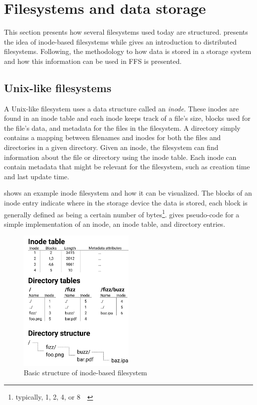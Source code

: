\section{Filesystems and data storage}
This section presents how several filesystems used today are structured.  presents the idea of \mbox{inode-based} filesystems while  gives an introduction to distributed filesystems. Following, the methodology to how data is stored in a storage system and how this information can be used in \gls{FFS} is presented.

\subsection{\mbox{Unix-like} filesystems}
\label{sec:inodeFSintroduction}
A \mbox{Unix-like} filesystem uses a data structure called an \textit{inode}. These inodes are found in an inode table and each inode keeps track of a file's size, blocks used for the file's data, and metadata for the files in the filesystem. A directory simply contains a mapping between filenames and inodes for both the files and directories in a given directory. Given an inode, the filesystem can find information about the file or directory using the inode table. Each inode can contain metadata that might be relevant for the filesystem, such as creation time and last update time. 

 shows an example inode filesystem and how it can be visualized. The blocks of an inode entry indicate where in the storage device the data is stored, each block is generally defined as being a certain number of bytes\footnote{typically, 1, 2, 4, or \SI{8}{\kibi\byte}}.  gives pseudo-code for a simple implementation of an inode, an inode table, and directory entries. 

\begin{figure}[!ht]
	\begin{center}
	  \includegraphics[width=0.5\textwidth]{figures.nosync/inode_diagram.png}
	\end{center}
	\caption{Basic structure of \mbox{inode-based} filesystem}
	\label{fig:inode_diag}
\end{figure}

